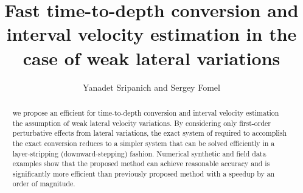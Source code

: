 
\title{Fast time-to-depth conversion and interval velocity estimation in the case of weak lateral variations}
\author{Yanadet Sripanich and Sergey Fomel}

\address{
Bureau of Economic Geology \\
John A. and Katherine G. Jackson School of Geosciences \\
The University of Texas at Austin \\
University Station, Box X \\
Austin, TX 78713-8924
}
\maketitle


\begin{abstract}
 we propose an efficient  for time-to-depth conversion and interval velocity estimation  the assumption of weak lateral velocity variations. By considering only first-order perturbative effects from lateral variations, the exact system of  required to accomplish the exact conversion reduces to a simpler system that can be solved efficiently in a layer-stripping (downward-stepping) fashion. Numerical synthetic and field data examples show that the proposed method can achieve reasonable accuracy and is significantly more efficient than previously proposed method with a speedup by an order of magnitude.
\end{abstract}

